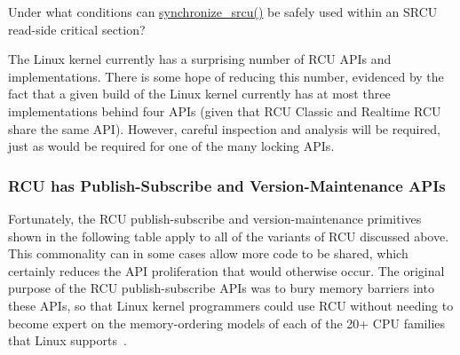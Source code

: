 \QuickQuiz{}
	Under what conditions can \url{synchronize_srcu()} be safely
	used within an SRCU read-side critical section?
 \QuickQuizEnd

The Linux kernel currently has a surprising number of RCU APIs and
implementations.
There is some hope of reducing this number, evidenced by the fact
that a given build of the Linux kernel currently has at most
three implementations behind four APIs (given that RCU Classic
and Realtime RCU share the same API).
However, careful inspection and analysis will be required, just as
would be required for one of the many locking APIs.

\subsubsection{RCU has Publish-Subscribe and Version-Maintenance APIs}
\label{sec:defer:RCU has Publish-Subscribe and Version-Maintenance APIs}

Fortunately, the RCU publish-subscribe and version-maintenance
primitives shown in the following
table apply to all of the variants of RCU discussed above.
This commonality can in some cases allow more code to be shared,
which certainly reduces the API proliferation that would otherwise
occur.
The original purpose of the RCU publish-subscribe APIs was to
bury memory barriers into these APIs, so that Linux kernel
programmers could use RCU without needing to become expert on
the memory-ordering models of each of the 20+ CPU families
that Linux supports~\cite{Spraul01}.

